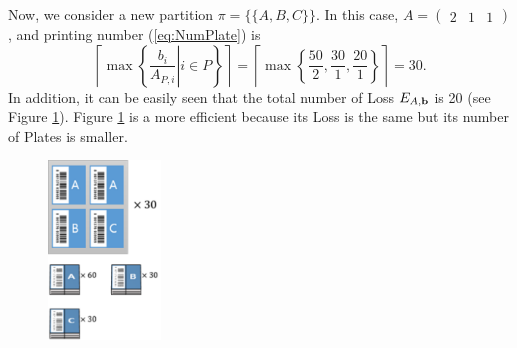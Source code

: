 \begin{example}
	Now, we consider a new partition $\pi = \{\{A, B, C\}\}$. In this case, $A = (\begin{array}{ccc}2 & 1 & 1 \end{array})$, and printing number (\ref{eq:NumPlate}) is 
	\begin{equation}
	\left\lceil \max\left\{ \left. \frac{b_{i}}{A_{P,i}} \right| i \in P \right\} \right\rceil = \left\lceil \max \left\{ \frac{50}{2}, \frac{30}{1}, \frac{20}{1} \right\} \right\rceil = 30.
	\end{equation}
	In addition, it can be easily seen that the total number of Loss $E_{A,{\bf b}}$ is 20 (see Figure \ref{fig:ex12}).
	Figure \ref{fig:ex12} is a more efficient because its Loss is the same but its number of Plates is smaller.
	\begin{figure}[h!]
		\centering
		\includegraphics[width=3cm]{ex12.pdf}
		\caption{}
		\label{fig:ex12}       %
	\end{figure}
\end{example}

